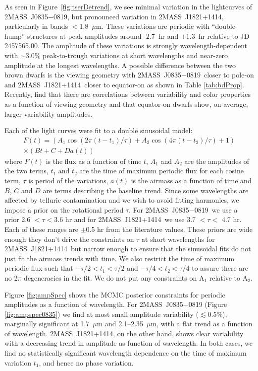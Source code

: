 \documentclass[twocolumn]{aastex6}
\newcommand{\sha}{2MASS~J0835$-$0819}
\newcommand{\shb}{2MASS~J1821+1414}
\begin{document}
As seen in Figure~\ref{fig:tserDetrend}, we see minimal variation in the lightcurves of {\sha}, but pronounced variation in {\shb}, particularly in bands $<$1.8~$\mu$m. 
These variations are periodic with ``double-hump'' structures at peak amplitudes around -2.7~hr and +1.3~hr relative to JD 2457565.00.
The amplitude of these variations is strongly wavelength-dependent with $\sim$3.0\% peak-to-trough variations at short 
wavelengths and near-zero amplitude at the longest wavelengths.
A possible difference between the two brown dwarfs is the viewing geometry with \sha\ closer to pole-on and \shb\ closer to equator-on as shown in Table \ref{tab:bdProp}.
Recently, \citet{vos2017viewingGeom} find that there are correlations between variability and color properties as a function of viewing geometry and that equator-on dwarfs show, on average, larger variability amplitudes.

Each of the light curves were fit to a double sinusoidal model:
\begin{equation}\label{eq:cosfit}
\begin{split}
F(t) = \left( A_1 \cos(2 \pi (t - t_1)/\tau) + A_2 \cos(4 \pi (t - t_2)/\tau) + 1\right) \\
\times (B t + C + D a(t))
\end{split}
\end{equation}
where $F(t)$ is the flux as a function of time $t$, $A_1$ and $A_2$ are the amplitudes of the two terms, $t_1$ and $t_2$ are the time of maximum periodic flux for each cosine term, $\tau$ is period of the variations, $a(t)$ is the airmass as a function of time and $B$, $C$ and $D$ are terms describing the baseline trend.
Since some wavelengths are affected by telluric contamination and we wish to avoid fitting harmonics, we impose a prior on the rotational period $\tau$.
For \sha\ we use a prior 2.6 $< \tau < $3.6 hr and for \shb\ we use 3.7 $< \tau <$ 4.7 hr.
Each of these ranges are $\pm$0.5 hr from the literature values.
These priors are wide enough they don't drive the constraints on $\tau$ at short wavelengths for \shb\ but narrow enough to ensure that the sinusoidal fits do not just fit the airmass trends with time.
We also restrict the time of maximum periodic flux such that $-\tau/2 < t_1 < \tau/2$ and $-\tau/4 < t_2 < \tau/4$ to assure there are no 2$\pi$ degeneracies in the fit.
We do not put any constraints on A$_1$ relative to A$_2$.

Figure \ref{fig:ampSpec} shows the MCMC posterior constraints for periodic amplitudes as a function of wavelength.
For {\sha} (Figure \ref{fig:ampspec0835}) we find at most small amplitude variability ($\lesssim 0.5\%$), marginally significant at 1.7~$\mu$m and 2.1--2.35~$\mu$m, with a flat trend as a function of wavelength.
\shb, on the other hand, shows clear variability with a decreasing trend in amplitude as function of wavelength.
In both cases, we find no statistically significant wavelength dependence on the time of maximum variation $t_1$, and hence no phase variation.
\end{document}
